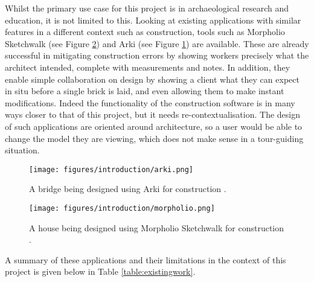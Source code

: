 \documentclass[12pt, a4paper]{article}
\begin{document}
Whilst the primary use case for this project is in archaeological research and education, it is not limited to this. Looking at existing applications with similar features in a different context such as construction, tools such as Morpholio Sketchwalk \cite{existing:morpholio} (see Figure \ref{fig:morpholio}) and Arki \cite{existing:arki} (see Figure \ref{fig:arki}) are available. These are already successful in mitigating construction errors by showing workers precisely what the architect intended, complete with measurements and notes. In addition, they enable simple collaboration on design \cite{existing:ardesign} by showing a client what they can expect in situ before a single brick is laid, and even allowing them to make instant modifications. Indeed the functionality of the construction software is in many ways closer to that of this project, but it needs re-contextualisation. The design of such applications are oriented around architecture, so a user would be able to change the model they are viewing, which does not make sense in a tour-guiding situation.

\begin{figure}[H]
    \centering
    \texttt{[image: figures/introduction/arki.png]}
    \caption{A bridge being designed using Arki for construction \cite{existing:arki}.}
    \label{fig:arki}
\end{figure}

\begin{figure}[H]
    \centering
    \texttt{[image: figures/introduction/morpholio.png]}
    \caption{A house being designed using Morpholio Sketchwalk for construction \cite{existing:morpholio}.}
    \label{fig:morpholio}
\end{figure}

A summary of these applications and their limitations in the context of this project is given below in Table \ref{table:existingwork}.
\end{document}
